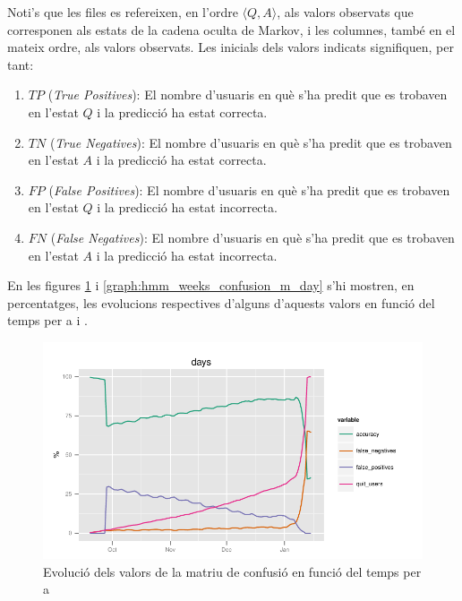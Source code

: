 \documentclass[
	a4paper,
	twoside,
	justified
]{tufte-book}
\begin{document}
Noti's que les files es refereixen, en l'ordre $\langle Q, A \rangle$, als valors observats que corresponen als estats de la cadena oculta de Markov, i les columnes, també en el mateix ordre, als valors observats. Les inicials dels valors indicats signifiquen, per tant:

\begin{enumerate}[(1)]
\item $TP$ (\emph{True Positives}): El nombre d'usuaris en què s'ha predit que es trobaven en l'estat $Q$ i la predicció ha estat correcta.  
\item $TN$ (\emph{True Negatives}): El nombre d'usuaris en què s'ha predit que es trobaven en l'estat $A$ i la predicció ha estat correcta.
\item $FP$ (\emph{False Positives}): El nombre d'usuaris en què s'ha predit que es trobaven en l'estat $Q$ i la predicció ha estat incorrecta. 
\item $FN$ (\emph{False Negatives}): El nombre d'usuaris en què s'ha predit que es trobaven en l'estat $A$ i la predicció ha estat incorrecta.
\end{enumerate}

En les figures \ref{graph:hmm_days_confusion_m_day} i \ref{graph:hmm_weeks_confusion_m_day} s'hi mostren, en percentatges, les evolucions respectives d'alguns d'aquests valors en funció del temps per a  i . 

\begin{figure}
\begin{center}
\includegraphics{hmm_days_confusion_m_day}
\caption{
\label{graph:hmm_days_confusion_m_day}
	Evolució dels valors de la matriu de confusió en funció del temps per a 	
}
\end{center}
\end{figure}
\end{document}

